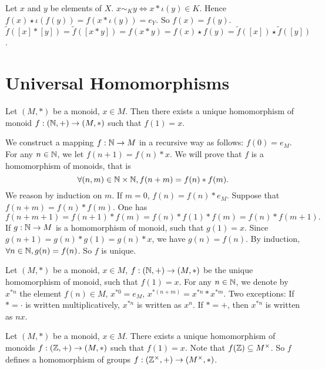 \documentclass{book}
\numberwithin{equation}{section}
\begin{document}
\begin{proofenv}
    Let $x$ and $y$ be elements of $X$. $x\sim_K y\Leftrightarrow x*\iota(y)\in K$. Hence $f(x)\star \iota(f(y))=f(x*\iota(y))=e_Y$. So $f(x)=f(y)$. $\tilde{f}([x]*[y])=\tilde{f}([x*y])=f(x*y)=f(x)\star f(y)=\tilde{f}([x])\star \tilde{f}([y])$.
\end{proofenv}

\section{Universal Homomorphisms}
\begin{propositionenv}
    Let $(M, *)$ be a monoid,  $x\in M$. Then there exists a unique homomorphism of monoid $f:(\mathbb{N}, +)\rightarrow (M, *)$ such that $f(1)=x$.
\end{propositionenv}
\begin{proofenv}
    We construct a mapping $f:\mathbb{N}\rightarrow M$ in a recursive way as follows: $f(0)=e_M$. For any $n\in \mathbb{N}$,  we let $f(n+1)=f(n)*x$. We will prove that $f$ is a homomorphism of monoids,  that is 
    $$\forall (n, m)\in \mathbb{N}\times \mathbb{N}, f(n+m)=f(n)*f(m).$$
    We reason by induction on $m$. If $m=0$,  $f(n)=f(n)*e_M$. Suppose that $f(n+m)=f(n)*f(m)$. One has $$f(n+m+1)=f(n+1)*f(m)=f(n)*f(1)*f(m)=f(n)*f(m+1).$$
    If $g:\mathbb{N}\rightarrow M$ is a homomorphism of monoid,  such that $g(1)=x$. Since $g(n+1)=g(n)*g(1)=g(n)*x$,  we have $g(n)=f(n)$. By induction,  $\forall n\in \mathbb{N}, g(n)=f(n)$. So $f$ is unique.
\end{proofenv}
\begin{notationenv}
    Let $(M, *)$ be a monoid,  $x\in M$,  $f:(\mathbb{N}, +)\rightarrow (M, *)$ be the unique homomorphism of monoid,  such that $f(1)=x$. For any $n\in \mathbb{N}$,  we denote by $x^{*n}$ the element $f(n)\in M$,  $x^{*0}=e_M$,  $x^{*(n+m)}=x^{*n}*x^{*m}$.
    \newline
    Two exceptions: If $*=\cdot$ is written multiplicatively,  $x^{*n}$ is written as $x^n$. If $*=+$,  then $x^{*n}$ is written as $nx$. 
\end{notationenv}
\begin{propositionenv}
    Let $(M, *)$ be a monoid,  $x\in M$. There exists a unique homomorphism of monoids $f:(\mathbb{Z}, +)\rightarrow (M, *)$ such that $f(1)=x$. Note that  $f(\mathbb{Z})\subseteq M^\times$. So $f$ defines a homomorphism of groups $f:(\mathbb{Z}^\times, +)\rightarrow (M^\times, *)$.
\end{propositionenv}
\end{document}
